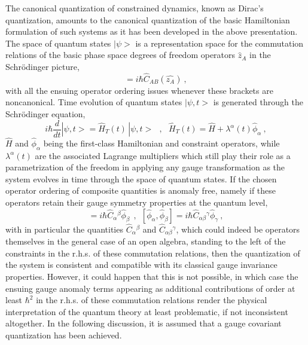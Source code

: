 \documentclass[a4paper,11pt]{article}
\begin{document}
The canonical quantization of constrained dynamics, known as Dirac's 
quantization,\cite{Dirac} amounts to the canonical quantization
of the basic Hamiltonian formulation of such systems as it has been
developed in the above presentation.\cite{JG1} The space of quantum states 
$|\psi>$ is a representation space for the commutation relations of the basic
phase space degrees of freedom operators $\hat{z}_A$ in the Schr\"odinger
picture,
\begin{equation}
[\hat{z}_a,\hat{z}_B]=i\hbar\hat{C}_{AB}(\hat{z_A})\ ,
\end{equation}
with all the ensuing operator ordering issues whenever these brackets
are noncanonical. Time evolution of quantum states $|\psi,t>$ is generated 
through the Schr\"odinger equation,
\begin{equation}
i\hbar\frac{d}{dt}|\psi,t>=\hat{H}_T(t)\,|\psi,t>\ \ \ ,\ \ \ 
\hat{H}_T(t)=\hat{H}+\lambda^\alpha(t)\hat{\phi}_\alpha\ ,
\end{equation}
$\hat{H}$ and $\hat{\phi}_\alpha$ being the first-class Hamiltonian
and constraint operators, while $\lambda^\alpha(t)$ are the associated
Lagrange multipliers which still play their role as a parametrization of
the freedom in applying any gauge transformation as the system evolves 
in time through the space of quantum states. If the chosen operator ordering 
of composite quantities is anomaly free, namely if these operators retain 
their gauge symmetry properties at the quantum level,
\begin{equation}
[\hat{H},\hat{\phi}_\alpha]=i\hbar{{\hat{C}}_\alpha}{}^\beta\hat{\phi}_\beta
\ \ ,\ \ 
[\hat{\phi}_\alpha,\hat{\phi}_\beta]=i\hbar{{\hat{C}}_{\alpha\beta}}{}^\gamma
\hat{\phi}_\gamma\ ,
\end{equation}
with in particular the quantities ${{\hat{C}}_\alpha}{}^\beta$ and
${{\hat{C}}_{\alpha\beta}}{}^\gamma$, which could indeed be ope\-ra\-tors
themselves in the general case of an open algebra, standing to the left of 
the constraints in the r.h.s. of these commutation relations,
then the quantization of the system is consistent and compatible with
its classical gauge invariance properties. However, it could happen that
this is not possible, in which case the ensuing gauge anomaly terms
appearing as additional contributions of order at least $\hbar^2$
in the r.h.s. of these commutation relations render the physical 
interpretation of the quantum theory at least problematic, if not 
inconsistent altogether. In the following discussion, it is assumed that
a gauge covariant quantization has been achieved.
\end{document}
